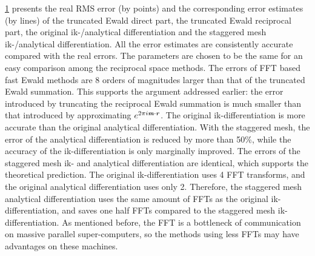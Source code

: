 \documentclass[journal=jacsat,manuscript=article]{achemso}
\newcommand{\redc}[1]{{\color{black} #1}}
\renewcommand{\v}[1]{\textbf{\textit{#1}}}
\begin{document}
\begin{figure}
  \label{fig:error1}
\end{figure}

\ref{fig:error1} presents the real RMS error (by points) and the
corresponding error estimates (by lines) of the \redc{truncated} Ewald direct
part, the truncated Ewald reciprocal part, the original ik-/analytical
differentiation and the staggered mesh ik-/analytical
differentiation. All the error estimates \redc{are consistently accurate compared with}
the real errors.  The parameters are
chosen to be the same for an easy comparison among the
reciprocal space methods.  The errors of FFT
based fast Ewald methods are 8 orders of magnitudes larger than that of
the truncated Ewald summation.
This supports the argument addressed earlier:
the error introduced by truncating the
reciprocal Ewald summation is much smaller than that introduced by
approximating $e^{2\pi i\v m\cdot\v r}$.
The original ik-differentiation is more accurate than
the original analytical differentiation.
With the staggered mesh,
the error of the analytical differentiation \redc{is reduced} by more than 50\%,
while the accuracy of the ik-differentiation is only marginally
improved.
The errors of the staggered mesh ik- and analytical differentiation
are identical, which supports the theoretical prediction.
The original ik-differentiation uses 4
FFT transforms, and the original analytical differentiation uses
only 2.  Therefore, the staggered mesh analytical differentiation uses
the same amount of FFTs as the original ik-differentiation, and saves
one half FFTs \redc{compared to} the staggered mesh ik-differentiation.  As mentioned before,
the FFT is a bottleneck of communication on massive parallel
super-computers,
so the methods using less FFTs may have advantages on these machines.
\end{document}
